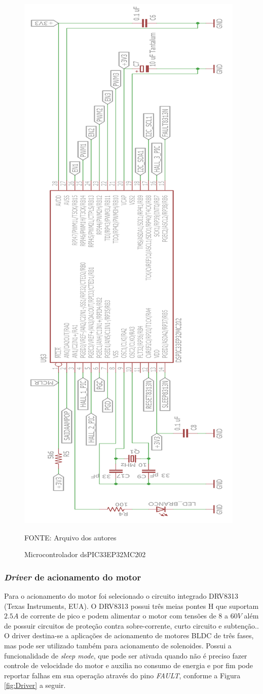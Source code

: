 \documentclass[
	12pt,				%
	openany,			%
	twoside,			%
	a4paper,			%
	english,			%
	french,				%
	spanish,			%
	brazil,				%
	oldfontcommands
	]{abntex2}
\begin{document}
\begin{figure}[th]
	\caption{Microcontrolador dsPIC33EP32MC202}
	\centering
	\includegraphics[height=1.2\linewidth]{./figs/dsPIC_motores}
	
	\begin{small}
		FONTE: Arquivo dos autores
	\end{small}
	\label{fig:dsPIC202}
\end{figure} 

\newpage

\subsubsection{\textit{Driver} de acionamento do motor}

Para o acionamento do motor foi selecionado o circuito integrado DRV8313 (Texas Instruments, EUA). O DRV8313 possui três meias pontes H que suportam $2.5A$ de corrente de pico e podem alimentar o motor com tensões de $8$ a $60V$ além de possuir circuitos de proteção contra sobre-corrente, curto circuito e subtenção.\cite{DRV8313}. O driver destina-se a aplicações de acionamento de motores BLDC de três fases, mas pode ser utilizado também para acionamento de solenoides. Possui a funcionalidade de \textit{sleep mode}, que pode ser ativada quando não é preciso fazer controle de velocidade do motor e auxilia no consumo de energia e por fim pode reportar falhas em sua operação através do pino \textit{FAULT}, conforme a Figura \ref{fig:Driver} a seguir.
\end{document}
